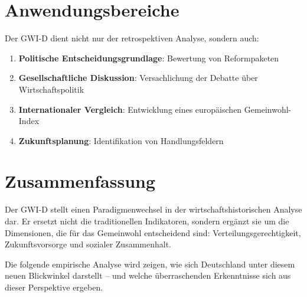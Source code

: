 \section{Anwendungsbereiche}

Der GWI-D dient nicht nur der retrospektiven Analyse, sondern auch:

\begin{enumerate}
\item \textbf{Politische Entscheidungsgrundlage}: Bewertung von Reformpaketen
\item \textbf{Gesellschaftliche Diskussion}: Versachlichung der Debatte über Wirtschaftspolitik
\item \textbf{Internationaler Vergleich}: Entwicklung eines europäischen Gemeinwohl-Index
\item \textbf{Zukunftsplanung}: Identifikation von Handlungsfeldern
\end{enumerate}

\section{Zusammenfassung}

Der GWI-D stellt einen Paradigmenwechsel in der wirtschaftshistorischen Analyse dar. Er ersetzt nicht die traditionellen Indikatoren, sondern ergänzt sie um die Dimensionen, die für das Gemeinwohl entscheidend sind: Verteilungsgerechtigkeit, Zukunftsvorsorge und sozialer Zusammenhalt.

Die folgende empirische Analyse wird zeigen, wie sich Deutschland unter diesem neuen Blickwinkel darstellt -- und welche überraschenden Erkenntnisse sich aus dieser Perspektive ergeben.